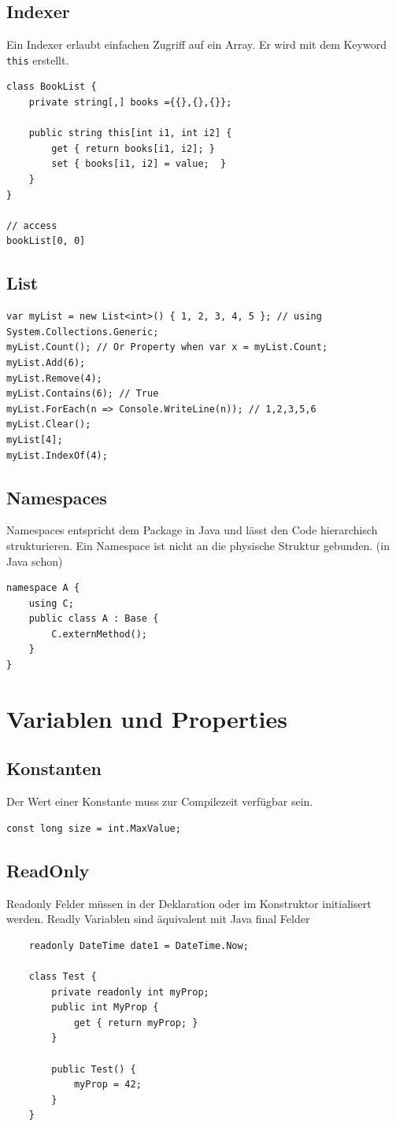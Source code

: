 \subsection{Indexer}
Ein Indexer erlaubt einfachen Zugriff auf ein Array. Er wird mit dem Keyword \lstinline|this| erstellt.
\begin{lstlisting}
class BookList {
	private string[,] books ={{},{},{}};

	public string this[int i1, int i2] {
		get { return books[i1, i2]; }
		set { books[i1, i2] = value;  } 
	}
}

// access
bookList[0, 0]
\end{lstlisting}

\subsection{List}
\begin{lstlisting}
var myList = new List<int>() { 1, 2, 3, 4, 5 }; // using System.Collections.Generic;
myList.Count(); // Or Property when var x = myList.Count;
myList.Add(6);
myList.Remove(4);
myList.Contains(6); // True
myList.ForEach(n => Console.WriteLine(n)); // 1,2,3,5,6
myList.Clear();
myList[4];
myList.IndexOf(4);
\end{lstlisting}


\subsection{Namespaces}
Namespaces entspricht dem Package in Java und lässt den Code hierarchisch strukturieren. Ein Namespace ist nicht an die physische Struktur gebunden. (in Java schon)
\begin{lstlisting}
namespace A {
	using C;
	public class A : Base {
		C.externMethod();
	}
}
\end{lstlisting}

\section{Variablen und Properties}
\subsection{Konstanten}
Der Wert einer Konstante muss zur Compilezeit verfügbar sein.
\begin{lstlisting}
const long size = int.MaxValue;
\end{lstlisting}

\subsection{ReadOnly}
Readonly Felder müssen in der Deklaration oder im Konstruktor initialisert werden. Readly Variablen sind äquivalent mit Java final Felder
\begin{lstlisting}
	readonly DateTime date1 = DateTime.Now;
	
	class Test {
		private readonly int myProp;
		public int MyProp {
			get { return myProp; }
		}
		
		public Test() {
			myProp = 42;
		}
	}
\end{lstlisting}

